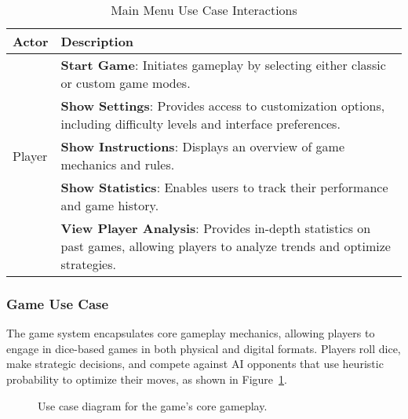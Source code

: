 \begin{table}[ht!]
    \centering
    \begin{tabular}{|l|p{12cm}|}
        \hline
        \textbf{Actor} & \textbf{Description} \\
        \hline
               & \textbf{Start Game}: Initiates gameplay by selecting either classic or custom game modes. \\
               & \textbf{Show Settings}: Provides access to customization options, including difficulty levels and interface preferences. \\
        Player & \textbf{Show Instructions}: Displays an overview of game mechanics and rules. \\
               & \textbf{Show Statistics}: Enables users to track their performance and game history. \\
               & \textbf{View Player Analysis}: Provides in-depth statistics on past games, allowing players to analyze trends and optimize strategies. \\
        \hline
    \end{tabular}    
    \caption{Main Menu Use Case Interactions}
    \label{tab:main_menu_usecase}
\end{table}

\subsubsection{Game Use Case}
The game system encapsulates core gameplay mechanics, allowing players to engage in dice-based games in both physical and digital formats. Players roll dice, make strategic decisions, and compete against AI opponents that use heuristic probability to optimize their moves, as shown in Figure~\ref{fig:game_usecase}.

\begin{figure}[ht!]
    \centering
    
    \caption{Use case diagram for the game's core gameplay.}
    \label{fig:game_usecase}
\end{figure}

